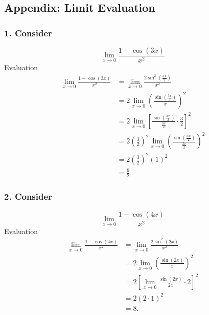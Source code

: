 \documentclass[../../../main.tex]{subfiles}
\begin{document}
\subsection{Appendix: Limit Evaluation}
\subsubsection{1. Consider}
\begin{equation*}
    \lim_{x \to 0} \frac{1 - \cos(3x)}{x^{2}}
\end{equation*}
Evaluation
\begin{align*}
    \lim_{x \to 0} \frac{1 - \cos(3x)}{x^{2}}
     & = \lim_{x \to 0} \frac{2\sin^{2}\!\left(\tfrac{3x}{2}\right)}{x^{2}}                                                     \\
     & = 2 \lim_{x \to 0} \left(\frac{\sin\!\left(\tfrac{3x}{2}\right)}{x}\right)^{2}                                           \\
     & = 2 \lim_{x \to 0} \left[\frac{\sin\!\left(\tfrac{3x}{2}\right)}{\tfrac{3x}{2}} \cdot \tfrac{3}{2}\right]^{2}            \\
     & = 2 \left(\tfrac{3}{2}\right)^{2} \lim_{x \to 0} \left(\frac{\sin\!\left(\tfrac{3x}{2}\right)}{\tfrac{3x}{2}}\right)^{2} \\
     & = 2 \left(\tfrac{3}{2}\right)^{2} (1)^{2}                                                                                \\
     & = \frac{9}{2}.
\end{align*}

\subsubsection{2. Consider}
\begin{equation*}
    \lim_{x \to 0} \frac{1 - \cos(4x)}{x^{2}}
\end{equation*}
Evaluation
\begin{align*}
    \lim_{x \to 0} \frac{1 - \cos(4x)}{x^{2}}
     & = \lim_{x \to 0} \frac{2\sin^{2}(2x)}{x^{2}}                    \\
     & = 2 \lim_{x \to 0} \left(\frac{\sin(2x)}{x}\right)^{2}          \\
     & = 2 \left[\lim_{x \to 0} \frac{\sin(2x)}{2x} \cdot 2\right]^{2} \\
     & = 2 \left(2 \cdot 1\right)^{2}                                  \\
     & = 8.
\end{align*}
\end{document}

